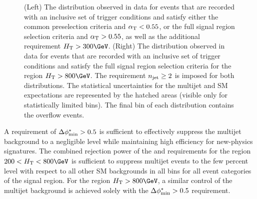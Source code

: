 \begin{figure}[!h]
{%
    (Left) The \alphat distribution observed in data for events that
    are recorded with an inclusive set of trigger conditions and
    satisfy either the common preselection criteria and $\alpha_{\text{T}} <
    0.55$, or the full signal region selection criteria and $\alpha_{\text{T}} >
    0.55$, as well as the additional requirement $\scalht > 300\GeV$.
    (Right) The \bdphi distribution observed in data for events that
    are recorded with an inclusive set of trigger conditions and
    satisfy the full signal region selection criteria for the region
    $\scalht > 800\GeV$. The requirement $n_{\text{jet}} \geq 2$ is imposed for
    both distributions. The statistical uncertainties for the multijet
    and SM expectations are represented by the hatched areas (visible
    only for statistically limited bins). The final bin of each
    distribution contains the overflow events.  }
  \label{fig:alphat-bdphi} 
\end{figure}

A requirement of $\mbox{$\Delta\phi^{*}_{\rm min}$} > 0.5$ is sufficient to effectively suppress
the multijet background to a negligible level while maintaining high
efficiency for new-physics signatures. The combined rejection power of
the \alphat and \bdphi requirements for the region $200 < \scalht <
800\GeV$ is sufficient to suppress multijet events to the few percent
level with respect to all other SM backgrounds in all \scalht bins for
all event categories of the signal region. For the region $\scalht >
800\GeV$, a similar control of the multijet background is achieved
solely with the $\mbox{$\Delta\phi^{*}_{\rm min}$} > 0.5$ requirement.

